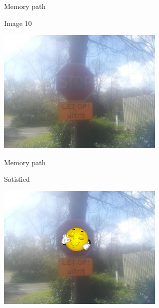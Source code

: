 \begin{frame}{Memory path}
  \begin{block}{Image 10}
    \begin{center}
      \includegraphics[height=6cm]{img/loci/10.jpg}
    \end{center}
  \end{block}
\end{frame}
\begin{frame}{Memory path}
  \begin{block}{Satisfied}
    \begin{center}
      \includegraphics[height=6cm]{img/loci/10-satisfied.jpg}
    \end{center}
  \end{block}
\end{frame}


